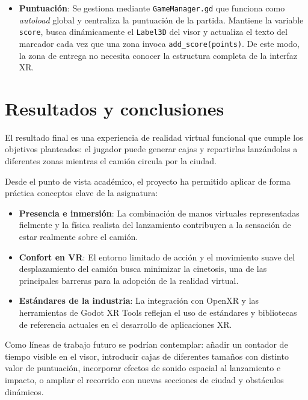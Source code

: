 \documentclass[12pt, a4paper]{article}
\begin{document}
\begin{itemize}[leftmargin=*]
    \item \textbf{Puntuación}: Se gestiona mediante \texttt{GameManager.gd} que funciona como \textit{autoload} global y centraliza la puntuación de la partida. Mantiene la variable \texttt{score}, busca dinámicamente el \texttt{Label3D} del visor y actualiza el texto del marcador cada vez que una zona invoca \texttt{add\_score(points)}. De este modo, la zona de entrega no necesita conocer la estructura completa de la interfaz XR.

\end{itemize}

\section{Resultados y conclusiones}

El resultado final es una experiencia de realidad virtual funcional que cumple los objetivos
planteados: el jugador puede generar cajas y repartirlas lanzándolas a diferentes zonas mientras el camión circula por la ciudad.

Desde el punto de vista académico, el proyecto ha permitido aplicar de forma práctica
conceptos clave de la asignatura:

\begin{itemize}[leftmargin=*]
    \item \textbf{Presencia e inmersión}: La combinación de manos virtuales representadas
    fielmente y la física realista del lanzamiento contribuyen a la sensación de estar
    realmente sobre el camión.
    \item \textbf{Confort en VR}: El entorno limitado de acción y el movimiento suave del desplazamiento del camión busca minimizar la cinetosis, una de las principales barreras para la adopción de la realidad virtual.
    \item \textbf{Estándares de la industria}: La integración con OpenXR y las herramientas de
    Godot XR Tools reflejan el uso de estándares y bibliotecas de referencia actuales en el
    desarrollo de aplicaciones XR.
\end{itemize}

Como líneas de trabajo futuro se podrían contemplar: añadir un contador de tiempo visible
en el visor, introducir cajas de diferentes tamaños con distinto valor de puntuación, incorporar
efectos de sonido espacial al lanzamiento e impacto, o ampliar el recorrido con nuevas secciones
de ciudad y obstáculos dinámicos.
\end{document}
